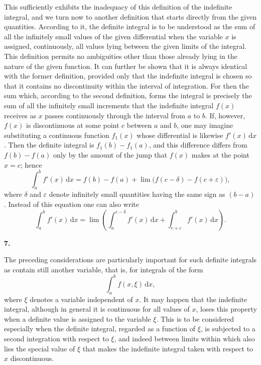 \documentclass[11pt]{article}
\newcommand{\dd}{\,\mathrm d}
\newcommand{\art}[1]{\bigskip\begin{center}\large\bfseries #1.\end{center}\nopagebreak}
\begin{document}
This sufficiently exhibits the inadequacy of this definition of the indefinite integral, and we turn now to another definition that starts directly from the given quantities. According to it, the definite integral is to be understood as the sum of all the infinitely small values of the given differential when the variable $x$ is assigned, continuously, all values lying between the given limits of the integral. This definition permits no ambiguities other than those already lying in the nature of the given function. It can further be shown that it is always identical with the former definition, provided only that the indefinite integral is chosen so that it contains no discontinuity within the interval of integration. For then the sum which, according to the second definition, forms the integral is precisely the sum of all the infinitely small increments that the indefinite integral $f(x)$ receives as $x$ passes continuously through the interval from $a$ to $b$. If, however, $f(x)$ is discontinuous at some point $c$ between $a$ and $b$, one may imagine substituting a continuous function $f_1(x)$ whose differential is likewise $f'(x)\dd x$. Then the definite integral is $f_1(b)-f_1(a)$, and this difference differs from $f(b)-f(a)$ only by the amount of the jump that $f(x)$ makes at the point $x=c$; hence
\[
\int_a^b f'(x)\dd x=f(b)-f(a)+\lim\bigl(f(c-\delta)-f(c+\varepsilon)\bigr),
\]
where $\delta$ and $\varepsilon$ denote infinitely small quantities having the same sign as $(b-a)$. Instead of this equation one can also write
\[
\int_a^b f'(x)\dd x=\lim\left(\int_a^{c-\delta}f'(x)\dd x+\int_{c+\varepsilon}^b f'(x)\dd x\right).
\]

\art{7}

The preceding considerations are particularly important for such definite integrals as contain still another variable, that is, for integrals of the form
\[
\int_a^b f(x,\xi)\dd x,
\]
where $\xi$ denotes a variable independent of $x$. It may happen that the indefinite integral, although in general it is continuous for all values of $x$, loses this property when a definite value is assigned to the variable $\xi$. This is to be considered especially when the definite integral, regarded as a function of $\xi$, is subjected to a second integration with respect to $\xi$, and indeed between limits within which also lies the special value of $\xi$ that makes the indefinite integral taken with respect to $x$ discontinuous.
\end{document}
